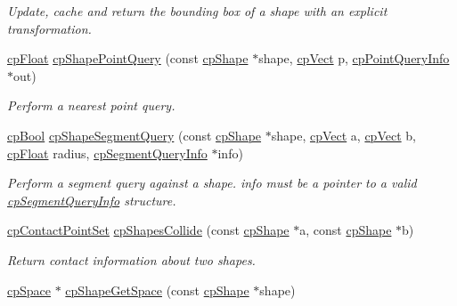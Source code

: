 \begin{DoxyCompactItemize}
\begin{DoxyCompactList}\small\item\em Update, cache and return the bounding box of a shape with an explicit transformation. \end{DoxyCompactList}\item 
\hyperlink{group__basic_types_gac1ed65573e035bf892505768c852d8d3}{cp\+Float} \hyperlink{group__cp_shape_ga6cca4a4d62cbede3b74302fcca3c10be}{cp\+Shape\+Point\+Query} (const \hyperlink{structcp_shape}{cp\+Shape} $\ast$shape, \hyperlink{structcp_vect}{cp\+Vect} p, \hyperlink{structcp_point_query_info}{cp\+Point\+Query\+Info} $\ast$out)
\begin{DoxyCompactList}\small\item\em Perform a nearest point query. \end{DoxyCompactList}\item 
\hypertarget{group__cp_shape_ga65e617c7f8022ac0c31603ca9039b18c}{}\hyperlink{group__basic_types_gabc5e752c48f3449ca26ef413ecbd647e}{cp\+Bool} \hyperlink{group__cp_shape_ga65e617c7f8022ac0c31603ca9039b18c}{cp\+Shape\+Segment\+Query} (const \hyperlink{structcp_shape}{cp\+Shape} $\ast$shape, \hyperlink{structcp_vect}{cp\+Vect} a, \hyperlink{structcp_vect}{cp\+Vect} b, \hyperlink{group__basic_types_gac1ed65573e035bf892505768c852d8d3}{cp\+Float} radius, \hyperlink{structcp_segment_query_info}{cp\+Segment\+Query\+Info} $\ast$info)\label{group__cp_shape_ga65e617c7f8022ac0c31603ca9039b18c}

\begin{DoxyCompactList}\small\item\em Perform a segment query against a shape. {\ttfamily info} must be a pointer to a valid \hyperlink{structcp_segment_query_info}{cp\+Segment\+Query\+Info} structure. \end{DoxyCompactList}\item 
\hypertarget{group__cp_shape_ga409bd7ae197af45bc6bc7fbef40cd09a}{}\hyperlink{structcp_contact_point_set}{cp\+Contact\+Point\+Set} \hyperlink{group__cp_shape_ga409bd7ae197af45bc6bc7fbef40cd09a}{cp\+Shapes\+Collide} (const \hyperlink{structcp_shape}{cp\+Shape} $\ast$a, const \hyperlink{structcp_shape}{cp\+Shape} $\ast$b)\label{group__cp_shape_ga409bd7ae197af45bc6bc7fbef40cd09a}

\begin{DoxyCompactList}\small\item\em Return contact information about two shapes. \end{DoxyCompactList}\item 
\hypertarget{group__cp_shape_gaa9bbb21dc2cc57f9d44efdd9013fae0a}{}\hyperlink{structcp_space}{cp\+Space} $\ast$ \hyperlink{group__cp_shape_gaa9bbb21dc2cc57f9d44efdd9013fae0a}{cp\+Shape\+Get\+Space} (const \hyperlink{structcp_shape}{cp\+Shape} $\ast$shape)\label{group__cp_shape_gaa9bbb21dc2cc57f9d44efdd9013fae0a}


\end{DoxyCompactItemize}
